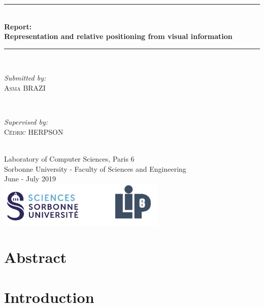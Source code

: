 \documentclass[12pt]{report}
\begin{document}
\begin{titlepage}
	
	\newcommand{\HRule}{\rule{\linewidth}{0.5mm}} %
	
	\center 
	\HRule \\[0.4cm]
	{ \huge \bfseries Report: \\Representation and relative positioning from visual information}\\[0.4cm]
	\HRule \\[1.5cm]
	
	\begin{minipage}{0.4\textwidth}
		\begin{flushleft} \large
			\emph{Submitted by:}\\
			\textsc{Asma BRAZI}
		\end{flushleft}
	\end{minipage}
	~
	\begin{minipage}{0.4\textwidth}
		\begin{flushright} \large
			\emph{Supervised by:} \\
			\textsc{Cédric HERPSON}\\
		\end{flushright}
	\end{minipage}\\[4cm]
	
	
	{\large Laboratory of Computer Sciences, Paris 6 \\ Sorbonne University - Faculty of Sciences and Engineering}\\[3cm] 
	{\large June - July 2019 }\\[3cm] 
	\includegraphics[width=0.6\textwidth]{logo.png}\\[1cm] 
	\vfill %
	
\end{titlepage}
\tableofcontents
\chapter{Abstract}
\chapter{Introduction}
\end{document}
